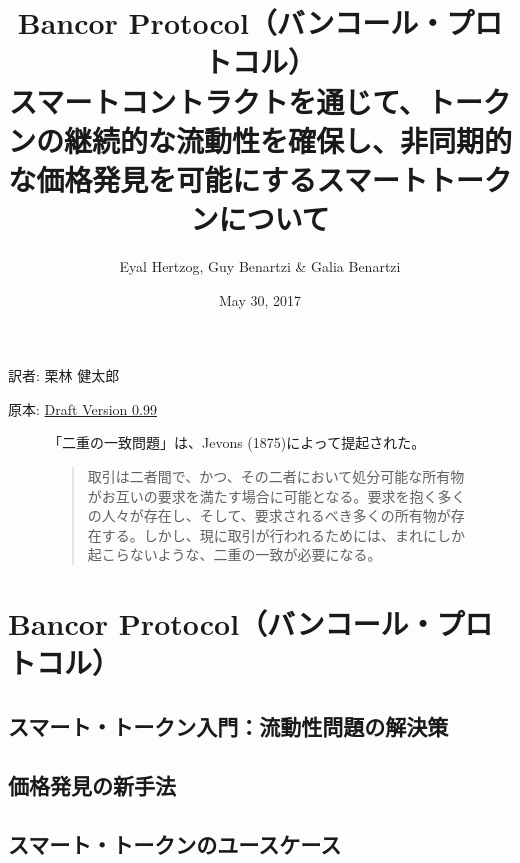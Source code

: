 \documentclass{jsarticle}
\begin{document}
\title{
  Bancor Protocol（バンコール・プロトコル） \\
  \large
  スマートコントラクトを通じて、トークンの継続的な流動性を確保し、非同期的な価格発見を可能にするスマートトークンについて
}

\author{Eyal Hertzog, Guy Benartzi \& Galia Benartzi}
\date{May 30, 2017}

\maketitle

\begin{center}
  \item[訳者:] 栗林 健太郎
  \item[原本:] \href{http://www.hyuki.com/girl/}{Draft Version 0.99}
\end{center}

\begin{figure}[b]
  「二重の一致問題」は、Jevons (1875)によって提起された。

  \begin{quotation}  
    取引は二者間で、かつ、その二者において処分可能な所有物がお互いの要求を満たす場合に可能となる。要求を抱く多くの人々が存在し、そして、要求されるべき多くの所有物が存在する。しかし、現に取引が行われるためには、まれにしか起こらないような、二重の一致が必要になる。
  \end{quotation}
\end{figure}

\newpage
\tableofcontents
\newpage

\section{Bancor Protocol（バンコール・プロトコル）}



\subsection{スマート・トークン入門：流動性問題の解決策}



\subsection{価格発見の新手法}



\subsection{スマート・トークンのユースケース}
\end{document}
